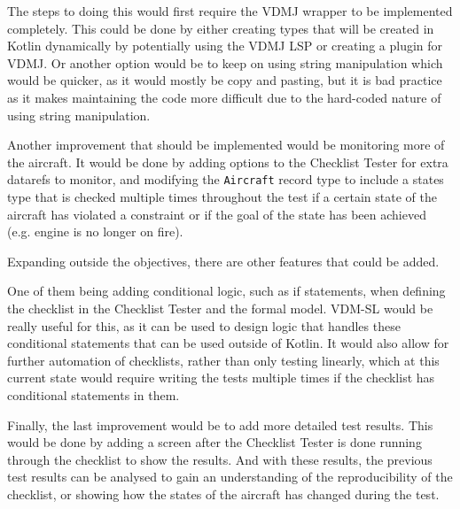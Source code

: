\documentclass[../dissertation.tex]{subfiles}
\begin{document}
The steps to doing this would first require the VDMJ wrapper to be implemented completely.
This could be done by either creating types that will be created in Kotlin dynamically
by potentially using the VDMJ LSP or creating a plugin for VDMJ. Or another option would
be to keep on using string manipulation which would be quicker, as it would
mostly be copy and pasting, but it is bad practice as it makes maintaining the code more
difficult due to the hard-coded nature of using string manipulation.

Another improvement that should be implemented would be monitoring more of the aircraft.
It would be done by adding options to the Checklist Tester for extra datarefs to monitor,
and modifying the \lstinline|Aircraft| record type to include a states type that is checked
multiple times throughout the test if a certain state of the aircraft has violated a
constraint or if the goal of the state has been achieved (e.g. engine is no longer on fire).

Expanding outside the objectives, there are other features that could be added.

One of them being adding conditional logic, such as if statements, when defining the checklist
in the Checklist Tester and the formal model.
VDM-SL would be really useful for this, as it can be used to design logic that handles
these conditional statements that can be used outside of Kotlin. It would also allow for
further automation of checklists, rather than only testing linearly, which at this current
state would require writing the tests multiple times if the checklist has conditional
statements in them.

Finally, the last improvement would be to add more detailed test results. This would
be done by adding a screen after the Checklist Tester is done running through the checklist
to show the results. And with these results, the previous test results can be
analysed to gain an understanding of the reproducibility of the checklist, or showing
how the states of the aircraft has changed during the test.
\end{document}
